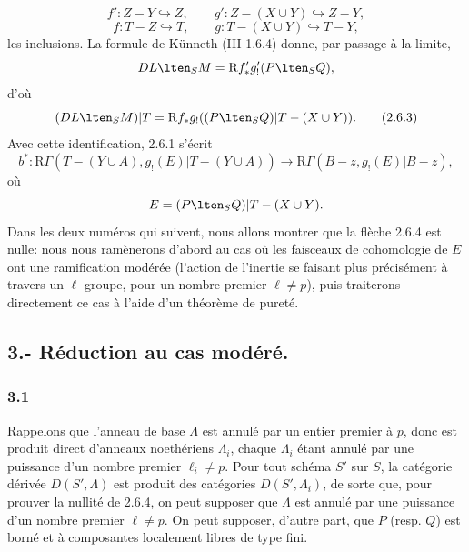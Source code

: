 \[
f':Z-Y\hookrightarrow Z,\qquad
g':Z-(X\cup Y)\hookrightarrow Z-Y,
\]
\[
f:T-Z\hookrightarrow T,\qquad
g:T-(X\cup Y)\hookrightarrow T-Y,
\]
les inclusions. La formule de Künneth (III 1.6.4) donne, par passage à la limite,
\[
DL\lten_SM=\mathrm{R} f'_*g'_!(P\lten_SQ),
\]
d'où
\begin{equation}
(DL\lten_SM)|T=\mathrm{R} f_*g_!((P\lten_SQ)|T-(X\cup Y)).
\tag{2.6.3}
\end{equation}
Avec cette identification, 2.6.1 s'écrit
\begin{equation}
b^*:\mathrm{R}\Gamma(T-(Y\cup A),g_!(E)|T-(Y\cup A))
 \longrightarrow \mathrm{R}\Gamma(B-z,g_!(E)|B-z),
\tag{2.6.4}
\end{equation}
où
\[
E=(P\lten_SQ)|T-(X\cup Y).
\]
Dans les deux numéros qui suivent, nous allons montrer que la flèche 2.6.4 est nulle: nous nous ramènerons d'abord au cas où les faisceaux de cohomologie de $E$ ont une ramification modérée (l'action de l'inertie se faisant plus précisément à travers un $\ell$-groupe, pour un nombre premier $\ell\ne p$), puis traiterons directement ce cas à l'aide d'un théorème de pureté.

\subsection*{3.- Réduction au cas modéré.}

\subsubsection*{3.1}
Rappelons que l'anneau de base $\Lambda$ est annulé par un entier premier à $p$, donc est produit direct d'anneaux noethériens $\Lambda_i$, chaque $\Lambda_i$ étant annulé par une puissance d'un nombre premier $\ell_i\ne p$. Pour tout schéma $S'$ sur $S$, la catégorie dérivée $D(S',\Lambda)$ est produit des catégories $D(S',\Lambda_i)$, de sorte que, pour prouver la nullité de 2.6.4, on peut supposer que $\Lambda$ est annulé par une puissance d'un nombre premier $\ell\ne p$. On peut supposer, d'autre part, que $P$ (resp. $Q$) est borné et à composantes localement libres de type fini.

